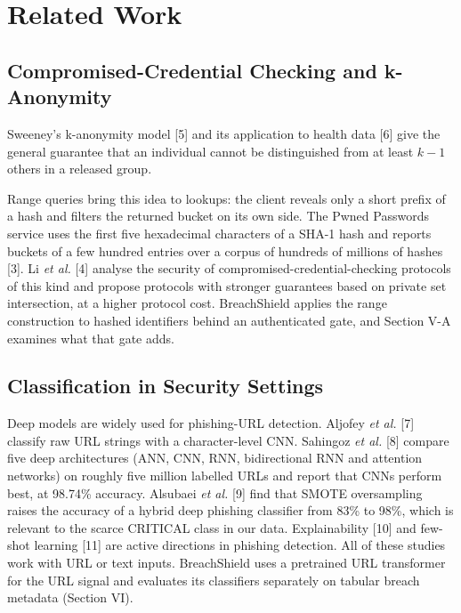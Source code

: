 \documentclass[10pt,twocolumn]{article}
\begin{document}
\section{Related Work}

\subsection{Compromised-Credential Checking and k-Anonymity}

Sweeney's k-anonymity model [5] and its application to health data [6] give the general guarantee that an individual cannot be distinguished from at least $k{-}1$ others in a released group.

Range queries bring this idea to lookups: the client reveals only a short prefix of a hash and filters the returned bucket on its own side. The Pwned Passwords service uses the first five hexadecimal characters of a SHA-1 hash and reports buckets of a few hundred entries over a corpus of hundreds of millions of hashes [3]. Li \textit{et al.} [4] analyse the security of compromised-credential-checking protocols of this kind and propose protocols with stronger guarantees based on private set intersection, at a higher protocol cost. BreachShield applies the range construction to hashed identifiers behind an authenticated gate, and Section V-A examines what that gate adds.

\subsection{Classification in Security Settings}

Deep models are widely used for phishing-URL detection. Aljofey \textit{et al.} [7] classify raw URL strings with a character-level CNN. Sahingoz \textit{et al.} [8] compare five deep architectures (ANN, CNN, RNN, bidirectional RNN and attention networks) on roughly five million labelled URLs and report that CNNs perform best, at 98.74\% accuracy. Alsubaei \textit{et al.} [9] find that SMOTE oversampling raises the accuracy of a hybrid deep phishing classifier from 83\% to 98\%, which is relevant to the scarce CRITICAL class in our data. Explainability [10] and few-shot learning [11] are active directions in phishing detection. All of these studies work with URL or text inputs. BreachShield uses a pretrained URL transformer for the URL signal and evaluates its classifiers separately on tabular breach metadata (Section VI).
\end{document}
